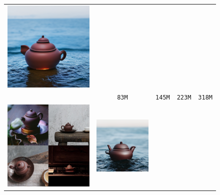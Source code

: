 \begin{figure}[!ht]
\begin{tabular}[t]{c c c c c}
    \includegraphics[width=\xwidth]{cp2/figures/dreambooth/teapot/c192_checkpoint_999.png} \\
    & \texttt{83M} & \texttt{145M} & \texttt{223M} & \texttt{318M} \\
    \multirow[t]{3}{*}{
    \includegraphics[width=0.3\linewidth]{cp2/figures/dreambooth/teapot/teapot.pdf}
    } &
    \includegraphics[width=\xwidth]{cp2/figures/dreambooth/teapot/c224_checkpoint_399.png} &

\end{tabular}
\end{figure}
